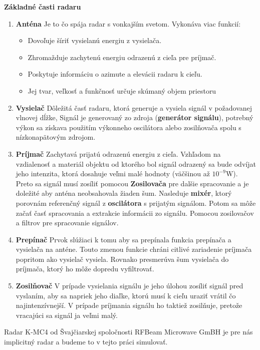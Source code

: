 \documentclass[slovak]{ExcelAtFIT} %
\begin{document}
	\textbf{Základné časti radaru}
    \begin{enumerate}
      \item \textbf{Anténa} Je to čo spája radar s vonkajším svetom. Vykonáva viac funkcií: \begin{itemize}
      		\item Dovoľuje šíriť vysielanú energiu z vysielača.
      		\item Zhromažduje zachytenú energiu odrazenú z cieľa pre príjmač.
      		\item Poskytuje informáciu o azimute a elevácii radaru k cieľu.
      		\item Jej tvar, veľkosť a funkčnosť určuje skúmaný objem priestoru
      	\end{itemize}
      \item \textbf{Vysielač} Dôležitá časť radaru, ktorá generuje a vysiela signál v požadovanej vlnovej dĺžke, Signál je generovaný zo zdroja (\textbf{generátor signálu}), potrebný výkon sa získava použitím výkonneho oscilátora alebo zosilňovača spolu s nízkonapätovým zdrojom. 	
      \item \textbf{Príjmač} Zachytavá prijatú odrazenú energiu z cieľa. Vzhľadom na vzdialenosť a materiál objektu od ktorého bol signál odrazený sa bude odvíjat jeho intenzita, ktorá dosahuje veľmi malé hodnoty (väčšinou až $10^{-9}$W). Preto sa signál musí zosíliť pomocou \textbf{Zosilovača} pre dalšie spracovanie a je doležité aby anténa neobsahovala žiaden šum. Nasleduje \textbf{mixér}, ktorý porovnám referenčný signál z \textbf{oscilátora} s prijatým signálom. Potom sa môže začať časť spracovania a extrakcie informácii zo signálu. Pomocou zosilovačov a filtrov pre spracovanie signálov.
      \item \textbf{Prepínač} Prvok slúžiaci k tomu aby sa prepínala funkcia prepínača a vysielača na anténe. Touto zmenou funkcie chráni citlivé zariadenie príjmača popritom ako vysielač vysiela. Rovnako presmerúva šum vysielača do príjmača, ktorý ho môže dopredu vyfiltrovať.
      \item \textbf{Zosilňovač} V prípade vysielania signálu je jeho úlohou zosíliť signál pred vyslaním, aby sa napriek jeho diaľke, ktorú musí k cieľu uraziť vrátil čo najintenzívnejší. V prípade príjmania signálu ho taktiež zosilňuje, pretože vracajúci sa signál ja veľmi malý.    
    \end{enumerate}

    Radar K-MC4 od Švajčiarskej spoločnosti RFBeam Microwave GmBH je pre nás implicitný radar a budeme to v tejto práci simulovať.
\end{document}
